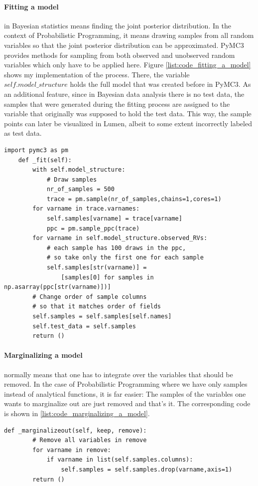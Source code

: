 \documentclass{article}
\begin{document}
\paragraph{Fitting a model} in Bayesian statistics means finding the joint posterior distribution. In the context of Probabilistic Programming, it means drawing samples from all random variables so that the joint posterior distribution can be approximated. PyMC3 provides methods for sampling from both observed and unobserved random variables which only have to be applied here. Figure \ref{list:code_fitting_a_model} shows my implementation of the process. There, the variable $self.model\_structure$ holds the full model that was created before in PyMC3. As an additional feature, since in Bayesian data analysis there is no test data, the samples that were generated during the fitting process are assigned to the variable that originally was supposed to hold the test data. This way, the sample points can later be visualized in Lumen, albeit to some extent incorrectly labeled as test data.
\begin{lstlisting}[caption={Implementation of fitting a model}, label={list:code_fitting_a_model},captionpos=b]
    import pymc3 as pm
    def _fit(self):
        with self.model_structure:
            # Draw samples
            nr_of_samples = 500
            trace = pm.sample(nr_of_samples,chains=1,cores=1)
        for varname in trace.varnames:
            self.samples[varname] = trace[varname]
            ppc = pm.sample_ppc(trace)
        for varname in self.model_structure.observed_RVs:
            # each sample has 100 draws in the ppc, 
            # so take only the first one for each sample
            self.samples[str(varname)] = 
                [samples[0] for samples in np.asarray(ppc[str(varname)])]			
        # Change order of sample columns 
        # so that it matches order of fields
        self.samples = self.samples[self.names]
        self.test_data = self.samples
        return ()
\end{lstlisting}
\paragraph{Marginalizing a model} normally means that one has to integrate over the variables that should be removed. In the case of Probabilistic Programming where we have only samples instead of analytical functions, it is far easier: The samples of the variables one wants to marginalize out are just removed and that's it. The corresponding code is shown in \autoref{list:code_marginalizing_a_model}.
\begin{lstlisting}[caption={Implementation of marginalizing a model}, label={list:code_marginalizing_a_model},captionpos=b]
    def _marginalizeout(self, keep, remove):
        # Remove all variables in remove
        for varname in remove:
            if varname in list(self.samples.columns):
                self.samples = self.samples.drop(varname,axis=1)
        return ()
\end{lstlisting}
\end{document}
